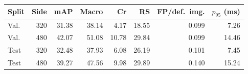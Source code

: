 \begin{tabular}{lrrrrrrr}\hline
Split & Side & mAP & Macro & Cr & RS & FP/def.\ img. & $p_{95}$ (ms) \\ \hline
Val. & 320 & 31.38 & 38.14 & 4.17 & 18.55 & 0.099 & 7.26 \\
Val. & 480 & 42.07 & 51.08 & 10.78 & 29.84 & 0.099 & 14.46 \\
Test & 320 & 32.48 & 37.93 & 6.08 & 26.19 & 0.101 & 7.45 \\
Test & 480 & 39.27 & 47.56 & 9.98 & 29.89 & 0.140 & 15.24 \\
\hline\end{tabular}

